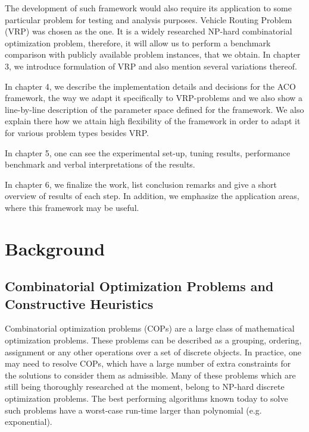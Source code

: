 \documentclass[11pt,a4paper,oneside]{book}
\begin{document}
The development of such framework would also require its application to some particular problem for testing and analysis purposes. Vehicle Routing Problem (VRP) was chosen as the one. It is a widely researched NP-hard combinatorial optimization problem, therefore, it will allow us to perform a benchmark comparison with publicly available problem instances, that we obtain. In chapter 3, we introduce formulation of VRP and also mention several variations thereof.

In chapter 4, we describe the implementation details and decisions for the ACO framework, the way we adapt it specifically to VRP-problems and we also show a line-by-line description of the parameter space defined for the framework. We also explain there how we attain high flexibility of the framework in order to adapt it for various problem types besides VRP.

In chapter 5, one can see the experimental set-up, tuning results, performance benchmark and verbal interpretations of the results.

In chapter 6, we finalize the work, list conclusion remarks and give a short overview of results of each step. In addition, we emphasize the application areas, where this framework may be useful. 

\chapter{Background}

\section{Combinatorial Optimization Problems and Constructive Heuristics}

Combinatorial optimization problems (COPs) are a large class of mathematical optimization problems. These problems can be described as a grouping, ordering, assignment or any other operations over a set of discrete objects. In practice, one may need to resolve COPs, which have a large number of extra constraints for the solutions to consider them as admissible. Many of these problems which are still being thoroughly researched at the moment, belong to NP-hard discrete optimization problems. The best performing algorithms known today to solve such problems have a worst-case run-time larger than polynomial (e.g. exponential).

\noindent{}
\end{document}
